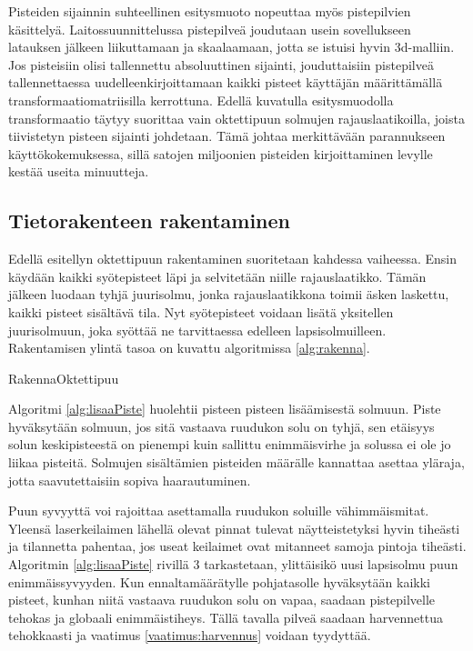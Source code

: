 Pisteiden sijainnin suhteellinen esitysmuoto nopeuttaa myös pistepilvien käsittelyä. Laitossuunnittelussa pistepilveä joudutaan usein sovellukseen latauksen jälkeen liikuttamaan ja skaalaamaan, jotta se istuisi hyvin 3d-malliin. Jos pisteisiin olisi tallennettu absoluuttinen sijainti, jouduttaisiin pistepilveä tallennettaessa uudelleenkirjoittamaan kaikki pisteet käyttäjän määrittämällä transformaatiomatriisilla kerrottuna. Edellä kuvatulla esitysmuodolla transformaatio täytyy suorittaa vain oktettipuun solmujen rajauslaatikoilla, joista tiivistetyn pisteen sijainti johdetaan. Tämä johtaa merkittävään parannukseen käyttökokemuksessa, sillä satojen miljoonien pisteiden kirjoittaminen levylle kestää useita minuutteja.

\subsection{Tietorakenteen rakentaminen}


Edellä esitellyn oktettipuun rakentaminen suoritetaan kahdessa vaiheessa. Ensin käydään kaikki syötepisteet läpi ja selvitetään niille rajauslaatikko. Tämän jälkeen luodaan tyhjä juurisolmu, jonka rajauslaatikkona toimii äsken laskettu, kaikki pisteet sisältävä tila. Nyt syötepisteet voidaan lisätä yksitellen juurisolmuun, joka syöttää ne tarvittaessa edelleen lapsisolmuilleen. Rakentamisen ylintä tasoa on kuvattu algoritmissa \ref{alg:rakenna}.

\begin{algorithm}[!h]
    \caption{RakennaOktettipuu}
    \label{alg:rakenna}
    
\end{algorithm}

Algoritmi \ref{alg:lisaaPiste} huolehtii pisteen pisteen lisäämisestä solmuun. Piste hyväksytään solmuun, jos sitä vastaava ruudukon solu on tyhjä, sen etäisyys solun keskipisteestä on pienempi kuin sallittu enimmäisvirhe ja solussa ei ole jo liikaa pisteitä. Solmujen sisältämien pisteiden määrälle kannattaa asettaa yläraja, jotta saavutettaisiin sopiva haarautuminen.

Puun syvyyttä voi rajoittaa asettamalla ruudukon soluille vähimmäismitat. Yleensä laserkeilaimen lähellä olevat pinnat tulevat näytteistetyksi hyvin tiheästi ja tilannetta pahentaa, jos useat keilaimet ovat mitanneet samoja pintoja tiheästi. Algoritmin \ref{alg:lisaaPiste} rivillä 3 tarkastetaan, ylittäisikö uusi lapsisolmu puun enimmäissyvyyden. Kun ennaltamäärätylle pohjatasolle hyväksytään kaikki pisteet, kunhan niitä vastaava ruudukon solu on vapaa, saadaan pistepilvelle tehokas ja globaali enimmäistiheys. Tällä tavalla pilveä saadaan harvennettua tehokkaasti ja vaatimus \ref{vaatimus:harvennus} voidaan tyydyttää. %

